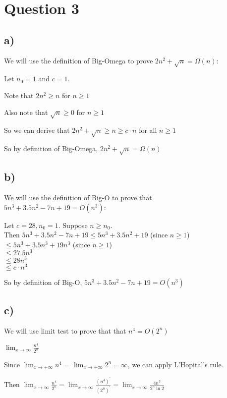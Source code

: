 \documentclass{article}
\begin{document}

\section*{Question 3}

\subsection*{a)}
We will use the definition of Big-Omega to prove $2n^2+\sqrt{n} = \Omega(n)$:

Let $n_0 = 1$ and $c = 1$.

Note that $ 2n^2 \geq n$ for $n \geq 1$

Also note that $\sqrt{n} \geq 0$ for $n \geq 1$

So we can derive that $2n^2+\sqrt{n} \geq n \geq c \cdot n$ for all $n \geq 1$

So by definition of Big-Omega, $2n^2+\sqrt{n} = \Omega(n)$

\subsection*{b)}
We will use the definition of Big-O to prove that $5n^3+3.5n^2-7n+19 = O(n^3)$:

Let $c = 28, n_0 = 1$. Suppose $n \geq n_0$.
\\ Then  $5n^3+3.5n^2-7n+19 \leq 5n^3 + 3.5n^2+19$ (since $n \geq 1$)
\\ $\leq 5n^3 + 3.5n^3 + 19n^3$ (since $n \geq 1$)
\\ $\leq 27.5n^3$
\\ $\leq 28n^3$
\\ $\leq c \cdot n^3$

So by definition of Big-O, $5n^3+3.5n^2-7n+19 = O(n^3)$

\subsection*{c)}
We will use limit test to prove that that $n^4 = O(2^n)$

$\lim_{x \to \infty} \frac{n^4}{2^n}$

Since $\lim_{x \to +\infty} n^4$ = $\lim_{x \to +\infty} 2^n = \infty$, we can apply L'Hopital's rule.

Then $\lim_{x \to \infty} \frac{n^4}{2^n} = \lim_{x \to \infty} \frac{(n^4)^\prime}{(2^n)^\prime} =  \lim_{x \to \infty} \frac{4n^3}{2^n \ln 2}$
\end{document}
